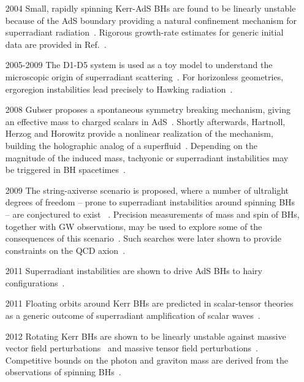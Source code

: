 \documentclass[11pt]{article}
\numberwithin{equation}{section} %
\begin{document}
\begin{itemize}[noitemsep]
\item[2004] Small, rapidly spinning Kerr-AdS BHs are found to be linearly unstable because of the AdS boundary providing a natural confinement mechanism for superradiant radiation~\cite{Cardoso:2004hs}. Rigorous growth-rate estimates for generic initial data are provided in Ref.~\cite{Shlapentokh-Rothman:2013ysa}.

\item [2005-2009] The D1-D5 system is used as a toy model to understand the microscopic origin of superradiant scattering~\cite{Cardoso:2005gj,Dias:2007nj}. For horizonless geometries, ergoregion instabilities lead precisely to Hawking radiation~\cite{Chowdhury:2007jx,Chowdhury:2008bd}.

\item[2008] Gubser proposes a spontaneous symmetry breaking mechanism, giving an effective mass to charged scalars in AdS~\cite{Gubser:2008px}.
Shortly afterwards, Hartnoll, Herzog and Horowitz provide a nonlinear realization of the mechanism, building the holographic analog of a superfluid~\cite{Hartnoll:2008vx}. Depending on the magnitude of the induced mass, tachyonic or superradiant instabilities may be triggered in BH spacetimes~\cite{Hartnoll:2011fn,Dias:2010ma,Dias:2011tj,Basu:2010uz}.
 
\item[2009] The string-axiverse scenario is proposed, where a number of ultralight degrees of freedom -- prone to superradiant instabilities around spinning BHs -- are conjectured to exist ~\cite{Arvanitaki:2009fg}. Precision measurements of mass and spin of BHs, together with GW observations, may be used to explore some of the consequences of this scenario~\cite{Arvanitaki:2009fg,Arvanitaki:2010sy}. Such searches were later shown to provide constraints on the QCD axion~\cite{Arvanitaki:2014wva}.


\item[2011] Superradiant instabilities are shown to drive AdS BHs to hairy configurations~\cite{Dias:2011tj,Dias:2011at}.

\item[2011] Floating orbits around Kerr BHs are predicted in scalar-tensor theories as a generic outcome of superradiant amplification of scalar waves~\cite{Cardoso:2011xi}.

\item[2012] Rotating Kerr BHs are shown to be linearly unstable against massive vector field perturbations~\cite{Pani:2012vp,Pani:2012bp,Witek:2012tr} and massive tensor field perturbations~\cite{Brito:2013wya}. Competitive bounds on the photon and graviton mass are derived from the observations of spinning BHs~\cite{PDG}.


\end{itemize}
\end{document}
